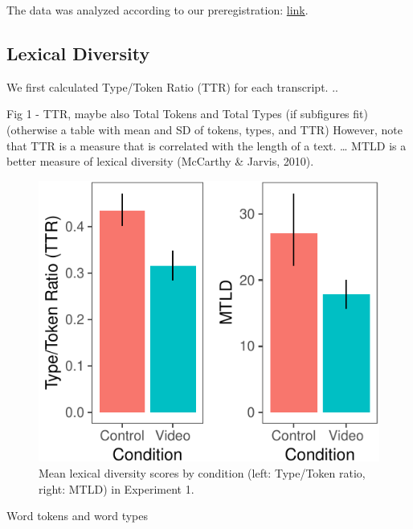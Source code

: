 \documentclass[10pt, letterpaper]{article}
\newenvironment{CodeChunk}{}{}
\begin{document}
The data was analyzed according to our preregistration:
\href{https://osf.io/2bpdf/}{link}.

\subsection{Lexical Diversity}\label{lexical-diversity}

We first calculated Type/Token Ratio (TTR) for each transcript. ..

Fig 1 - TTR, maybe also Total Tokens and Total Types (if subfigures fit)
(otherwise a table with mean and SD of tokens, types, and TTR) However,
note that TTR is a measure that is correlated with the length of a text.
\ldots{} MTLD is a better measure of lexical diversity (McCarthy \&
Jarvis, 2010).

\begin{CodeChunk}
\begin{figure}[H]

{\centering \includegraphics{figs/e1lex_div-1} 

}

\caption[Mean lexical diversity scores by condition (left]{Mean lexical diversity scores by condition (left: Type/Token ratio, right: MTLD) in Experiment 1.}\label{fig:e1lex_div}
\end{figure}
\end{CodeChunk}

Word tokens and word types
\end{document}
